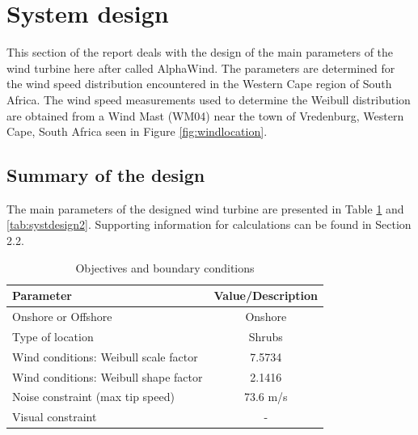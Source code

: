 \section{System design} \label{sec:system design}
This section of the report deals with the design of the main parameters of the wind turbine here after called AlphaWind. The parameters are determined for the wind speed distribution encountered in the Western Cape region of South Africa. The wind speed measurements used to determine the Weibull distribution are obtained from a Wind Mast (WM04) near the town of Vredenburg, Western Cape, South Africa seen in Figure \ref{fig:windlocation}.


\subsection{Summary of the design}

The main parameters of the designed wind turbine are presented in Table \ref{tab:systdesign1} and \ref{tab:systdesign2}. Supporting information for calculations can be found in Section 2.2.

\begin{table}[H]
\begin{center} 
\caption{Objectives and boundary conditions}\label{tab:systdesign1}
\begin{tabular}{ |l|c| } 
\hline
\textbf{Parameter} & \textbf{Value/Description}  \\ 
\hline
Onshore or Offshore & Onshore  \\ 
\hline
Type of location & Shrubs \\ 
\hline
Wind conditions: Weibull scale factor & 7.5734 \\
\hline
Wind conditions: Weibull shape factor & 2.1416 \\
\hline
Noise constraint (max tip speed) & 73.6 m/s \\
\hline
Visual constraint & - \\
\hline
\end{tabular}
\end{center}
\end{table}

